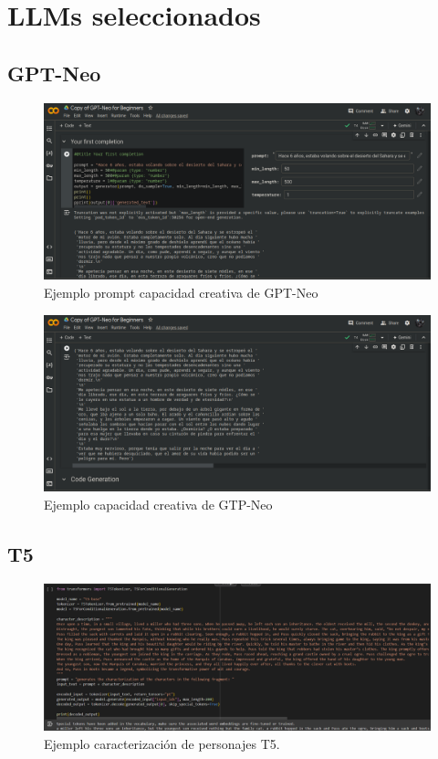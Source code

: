 \documentclass[journal,onecolumn]{IEEEtran}
\begin{document}
	\section{LLMs seleccionados}
	\subsection{GPT-Neo}
	\begin{figure}[H]
	\centering
	\includegraphics[scale=0.5]{gptneo_1}
	\caption{Ejemplo prompt capacidad creativa de GPT-Neo }
	\small
	\label{table:1}
\end{figure}
	\begin{figure}[H]
	\centering
	\includegraphics[scale=0.5]{gptneo_2}
	\caption{Ejemplo capacidad creativa de GTP-Neo}
	\small
\end{figure}
	\subsection{T5}
	\begin{figure}[H]
		\centering
		\includegraphics[scale=0.5]{t5test1}
		\caption{Ejemplo caracterización de personajes T5.}
		\small
	\end{figure}
	
\end{document}
